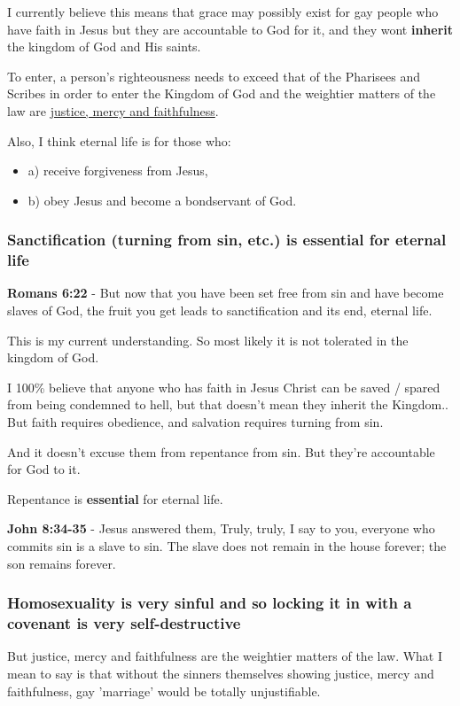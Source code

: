 \documentclass[11pt]{article}
\begin{document}
I currently believe this means that grace may possibly
exist for gay people who have faith in Jesus
but they are accountable to God for it, and
they wont \textbf{inherit} the kingdom of God and His saints.

To enter, a person's righteousness needs to exceed that of
the Pharisees and Scribes in order to enter the Kingdom of God and
the weightier matters of the law are \uline{justice, mercy and faithfulness}.

Also, I think eternal life is for those who:
\begin{itemize}
\item a) receive forgiveness from Jesus,
\item b) obey Jesus and become a bondservant of God.
\end{itemize}

\subsubsection{Sanctification (turning from sin, etc.) is essential for eternal life}
\label{sec:orgff3807f}

\textbf{Romans 6:22} - But now that you have been set free from sin and have become slaves of God, the fruit you get leads to sanctification and its end, eternal life.

This is my current understanding. So most likely it is not tolerated in the kingdom of God.

I 100\% believe that anyone who has faith in Jesus Christ can be saved / spared from being condemned to hell, but that doesn't mean they inherit the Kingdom..
But faith requires obedience, and salvation requires turning from sin.

And it doesn't excuse them from repentance from sin.
But they're accountable for God to it.

Repentance is \textbf{essential} for eternal life.

\textbf{John 8:34-35} - Jesus answered them, Truly, truly, I say to you, everyone who commits sin is a slave to sin. The slave does not remain in the house forever; the son remains forever.

\subsubsection{Homosexuality is very sinful and so locking it in with a covenant is very self-destructive}
\label{sec:orgd441a60}
But justice, mercy and faithfulness are the weightier matters of the law.
What I mean to say is that without the sinners themselves showing justice,
mercy and faithfulness, gay 'marriage' would be totally unjustifiable.
\end{document}
